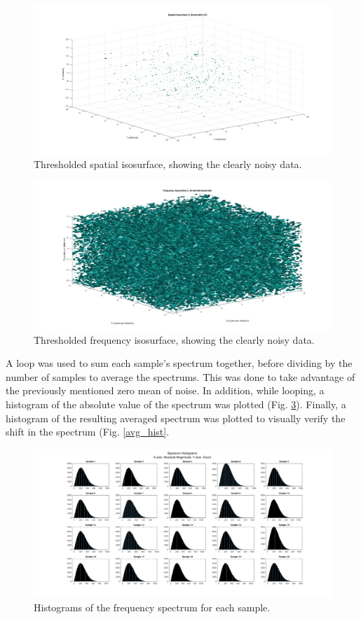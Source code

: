 \documentclass[journal]{IEEEtran}
\begin{document}
\begin{figure}
	\centerline{\includegraphics[width=\columnwidth]{spatial_isosurface.png}}
	\caption{Thresholded spatial isosurface, showing the clearly noisy data.}\label{spatial_isosurface}
\end{figure}

\begin{figure}
	\centerline{\includegraphics[width=\columnwidth]{freq_isosurface.png}}
	\caption{Thresholded frequency isosurface, showing the clearly noisy data.}\label{freq_isosurface}
\end{figure}


A loop was used to sum each sample's spectrum together, before dividing by the number of samples to average the spectrums. This was done to take advantage of the previously mentioned zero mean of noise. In addition, while looping, a histogram of the absolute value of the spectrum was plotted (Fig. \ref{freq_hists}). Finally, a histogram of the resulting averaged spectrum was plotted to visually verify the shift in the spectrum (Fig. \ref{avg_hist}.

\begin{figure}
	\centerline{\includegraphics[width=\columnwidth]{spectrum_hists.png}}
	\caption{Histograms of the frequency spectrum for each sample.}\label{freq_hists}
\end{figure}
\end{document}
